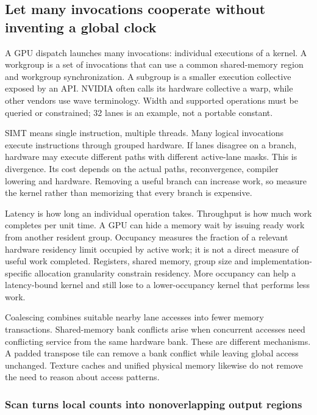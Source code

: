 \subsection{Let many invocations cooperate without inventing a global clock}\label{let-many-invocations-cooperate-without-inventing-a-global-clock}

A GPU dispatch launches many invocations: individual executions of a kernel. A workgroup is a set of invocations that can use a common shared-memory region and workgroup synchronization. A subgroup is a smaller execution collective exposed by an API. NVIDIA often calls its hardware collective a warp, while other vendors use wave terminology. Width and supported operations must be queried or constrained; 32 lanes is an example, not a portable constant.

SIMT means single instruction, multiple threads. Many logical invocations execute instructions through grouped hardware. If lanes disagree on a branch, hardware may execute different paths with different active-lane masks. This is divergence. Its cost depends on the actual paths, reconvergence, compiler lowering and hardware. Removing a useful branch can increase work, so measure the kernel rather than memorizing that every branch is expensive.

Latency is how long an individual operation takes. Throughput is how much work completes per unit time. A GPU can hide a memory wait by issuing ready work from another resident group. Occupancy measures the fraction of a relevant hardware residency limit occupied by active work; it is not a direct measure of useful work completed. Registers, shared memory, group size and implementation-specific allocation granularity constrain residency. More occupancy can help a latency-bound kernel and still lose to a lower-occupancy kernel that performs less work.

Coalescing combines suitable nearby lane accesses into fewer memory transactions. Shared-memory bank conflicts arise when concurrent accesses need conflicting service from the same hardware bank. These are different mechanisms. A padded transpose tile can remove a bank conflict while leaving global access unchanged. Texture caches and unified physical memory likewise do not remove the need to reason about access patterns.

\subsubsection{Scan turns local counts into nonoverlapping output regions}\label{scan-turns-local-counts-into-nonoverlapping-output-regions}

